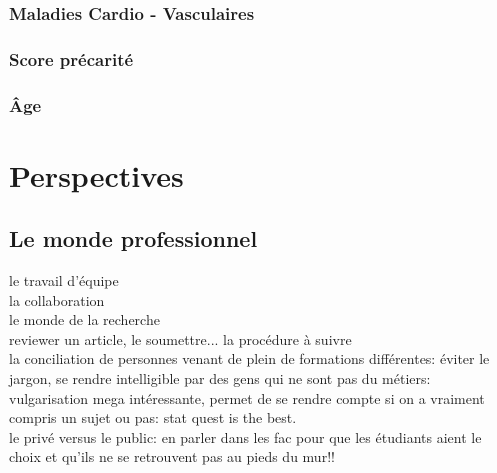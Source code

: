 \documentclass{book}
\begin{document}
\subsubsection{Maladies Cardio - Vasculaires}
\subsubsection{Score précarité}
\subsubsection{Âge}

\newpage
\section{Perspectives}

\subsection{Le monde professionnel}
le travail d'équipe\\
la collaboration\\
le monde de la recherche\\
reviewer un article, le soumettre... la procédure à suivre\\
la conciliation de personnes venant de plein de formations différentes: éviter le jargon, se rendre intelligible par des gens qui ne sont pas du métiers: vulgarisation mega intéressante, permet de se rendre compte si on a vraiment compris un sujet ou pas: stat quest is the best.\\
le privé versus le public: en parler dans les fac pour que les étudiants aient le choix et qu'ils ne se retrouvent pas au pieds du mur!!
\end{document}
